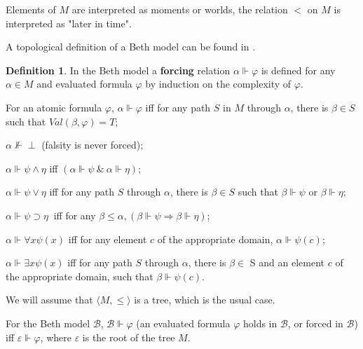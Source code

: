 \documentclass{asl}
\theoremstyle{definition}
\newtheorem{definition}{Definition}[section]
\begin{document}
Elements of $M$ are interpreted as moments or worlds, the relation $ < $ on $M$ is interpreted as "later in time". 

A topological definition of a Beth model can be found in \cite{drag87}.

\begin{definition}
In the Beth model a \textbf{forcing} relation $\alpha\Vdash\varphi $ is defined for any $\alpha \!\in \!M$  and evaluated formula $\varphi$ by induction on the complexity of $\varphi$.


For an atomic formula $ \varphi$, $\alpha\Vdash\varphi $
iff for any path $S$ in $M$ through $\alpha$, there is
$\beta \in S$ such that $Val(\beta,\varphi)=T$;

\smallskip

$\alpha\not\Vdash \perp$ (falsity is never forced);
\smallskip

$\alpha\Vdash \psi \wedge \eta $ iff $(\alpha\!\Vdash\psi\:\&\:\alpha\!\Vdash \eta)$;
\smallskip      

$\alpha\Vdash\psi\vee\eta$ iff for any path $S$ through $\alpha$,
there is $\beta\!\in\!S$ such that $\beta\Vdash\psi$  or $\beta\Vdash\eta$;
\smallskip

$\alpha\Vdash\psi\supset\eta\ $ iff for any $ \beta\leqslant\alpha,(\beta\Vdash\psi\Rightarrow\beta\Vdash\eta)$;
\smallskip

$\alpha\Vdash\forall x\psi(x)$ iff for any element $c$ of the appropriate domain,
$\alpha\Vdash\psi(c)$;
\smallskip

$\alpha\Vdash\exists x\psi(x)$ iff for any path $ S $ through $\alpha$,
 there is $\beta\!\in$ S and an element
$c$ of the appropriate domain, such that $\beta\Vdash\psi(c).$

\label{def:forcing}
\end{definition}

We will assume that $\langle M, \leqslant \rangle$ is a tree, which is the usual case. 

For the Beth model $ \mathcal{B} $, $\mathcal{B}\Vdash \varphi$ (an evaluated formula $\varphi$ holds in  $\mathcal{B}$, or forced in $\mathcal{B}$) iff  $ \varepsilon \Vdash  \varphi$, where $\varepsilon $ is the root of the tree $M$.
\end{document}
